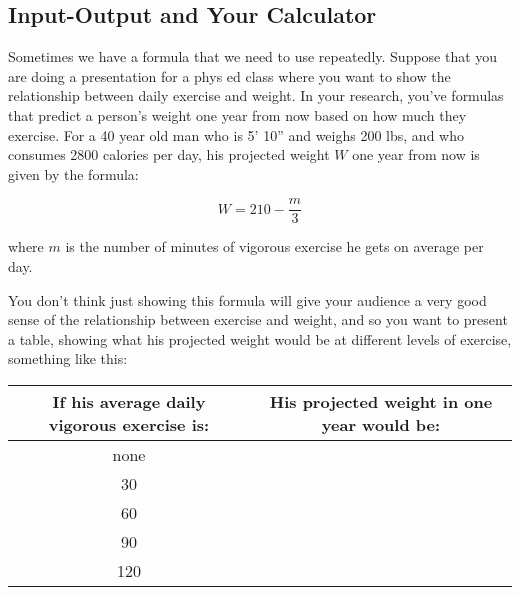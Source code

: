 

%
%

\subsection{Input-Output and Your Calculator}

Sometimes we have a formula that we need to use repeatedly. Suppose that you are doing a presentation for a phys ed class where you want to show the relationship between daily exercise and weight. In your research, you’ve formulas that predict a person’s weight one year from now based on how much they exercise. For a 40 year old man who is 5’ 10” and weighs 200 lbs, and who consumes 2800 calories per day, his projected weight $W$ one year from now is given by the formula:

$$W=210-\frac{m}{3}$$

where $m$ is the number of minutes of vigorous exercise he gets on average per day.

You don’t think just showing this formula will give your audience a very good sense of the relationship between exercise and weight, and so you want to present a table, showing what his projected weight would be at different levels of exercise, something like this:

\begin{center}
\begin{tabular}{|c|c|}
	\hline
	If his average daily vigorous exercise is: & His projected weight in one year would be:\\
	\hline
	none &\\
	\hline
	30 &\\
	\hline
	60 &\\
	\hline
	90 &\\
	\hline
	120 &\\
	\hline
\end{tabular}
\end{center}

